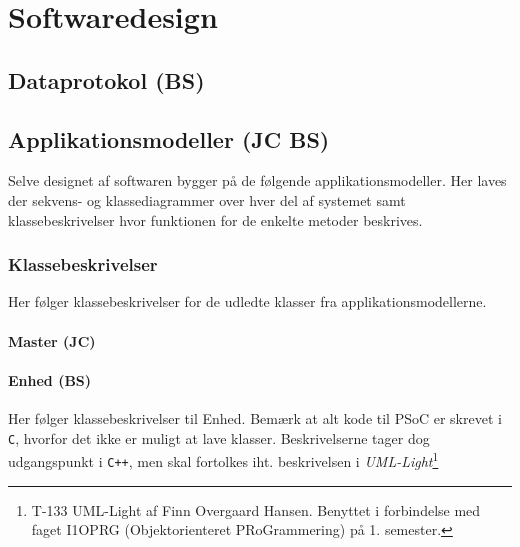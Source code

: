 \chapter{Softwaredesign}

\section{Dataprotokol (BS)}\label{header:dataprotokol}


\section{Applikationsmodeller (JC BS)}
Selve designet af softwaren bygger på de følgende applikationsmodeller. Her laves der sekvens- og klassediagrammer over hver del af systemet samt klassebeskrivelser hvor funktionen for de enkelte metoder beskrives.



\subsection{Klassebeskrivelser}
Her følger klassebeskrivelser for de udledte klasser fra applikationsmodellerne.

\subsubsection{Master (JC)}





\subsubsection{Enhed (BS)}
Her følger klassebeskrivelser til Enhed. 
Bemærk at alt kode til PSoC er skrevet i \verb+C+, hvorfor det ikke er muligt at lave klasser. Beskrivelserne tager dog udgangspunkt i \verb-C++-, men skal fortolkes iht. beskrivelsen i \textit{UML-Light}\footnote{T-133 UML-Light af Finn Overgaard Hansen. Benyttet i forbindelse med faget I1OPRG (Objektorienteret PRoGrammering) på 1. semester.} 





\clearpage

